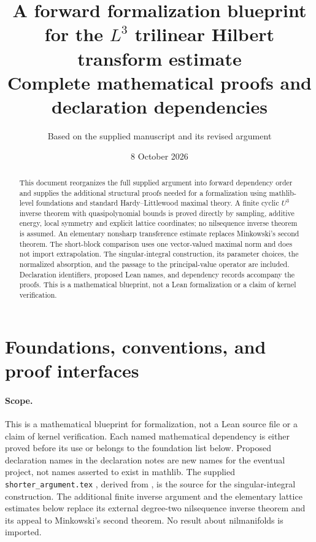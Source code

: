 \documentclass[11pt]{article}
\title{A forward formalization blueprint\\for the $L^3$ trilinear Hilbert transform estimate\\[5pt]
\large Complete mathematical proofs and declaration dependencies}
\author{Based on the supplied manuscript and its revised argument}
\date{8 October 2026}
\theoremstyle{definition}
\numberwithin{equation}{section}
\begin{document}
\maketitle
\begin{abstract}
This document reorganizes the full supplied argument into forward dependency order and supplies the additional structural proofs needed for a formalization using mathlib-level foundations and standard Hardy--Littlewood maximal theory. A finite cyclic $U^3$ inverse theorem with quasipolynomial bounds is proved directly by sampling, additive energy, local symmetry and explicit lattice coordinates; no nilsequence inverse theorem is assumed. An elementary nonsharp transference estimate replaces Minkowski's second theorem. The short-block comparison uses one vector-valued maximal norm and does not import extrapolation. The singular-integral construction, its parameter choices, the normalized absorption, and the passage to the principal-value operator are included. Declaration identifiers, proposed Lean names, and dependency records accompany the proofs. This is a mathematical blueprint, not a Lean formalization or a claim of kernel verification.
\end{abstract}
\tableofcontents
\clearpage
\section{Foundations, conventions, and proof interfaces}\label{sec:foundations}
\paragraph{Scope.}
This is a mathematical blueprint for formalization, not a Lean source file or a claim of kernel verification. Each named mathematical dependency is either proved before its use or belongs to the foundation list below. Proposed declaration names in the declaration notes are new names for the eventual project, not names asserted to exist in mathlib. The supplied \nolinkurl{shorter_argument.tex} \cite{R}, derived from \cite{M}, is the source for the singular-integral construction. The additional finite inverse argument and the elementary lattice estimates below replace its external degree-two nilsequence inverse theorem and its appeal to Minkowski's second theorem. No result about nilmanifolds is imported.
\end{document}
